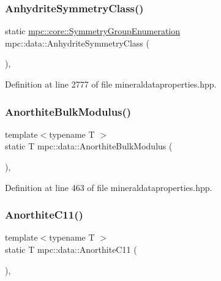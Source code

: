 \subsubsection{\texorpdfstring{Anhydrite\+Symmetry\+Class()}{AnhydriteSymmetryClass()}}
{\footnotesize\ttfamily static \mbox{\hyperlink{namespacempc_1_1core_a9d979684062547055a0ef5c13077bad8}{mpc\+::core\+::\+Symmetry\+Group\+Enumeration}} mpc\+::data\+::\+Anhydrite\+Symmetry\+Class (\begin{DoxyParamCaption}{ }\end{DoxyParamCaption})\hspace{0.3cm}{\ttfamily [inline]}, {\ttfamily [static]}}



Definition at line 2777 of file mineraldataproperties.\+hpp.

\mbox{\label{namespacempc_1_1data_ab8e79f203a9a0fb9e5035edb8434beb3}} 
\subsubsection{\texorpdfstring{Anorthite\+Bulk\+Modulus()}{AnorthiteBulkModulus()}}
{\footnotesize\ttfamily template$<$typename T $>$ \\
static T mpc\+::data\+::\+Anorthite\+Bulk\+Modulus (\begin{DoxyParamCaption}{ }\end{DoxyParamCaption})\hspace{0.3cm}{\ttfamily [inline]}, {\ttfamily [static]}}



Definition at line 463 of file mineraldataproperties.\+hpp.

\mbox{\label{namespacempc_1_1data_aae7d252fc61b5c0b052096739c3a6e42}} 
\subsubsection{\texorpdfstring{Anorthite\+C11()}{AnorthiteC11()}}
{\footnotesize\ttfamily template$<$typename T $>$ \\
static T mpc\+::data\+::\+Anorthite\+C11 (\begin{DoxyParamCaption}{ }\end{DoxyParamCaption})\hspace{0.3cm}{\ttfamily [inline]}, {\ttfamily [static]}}



